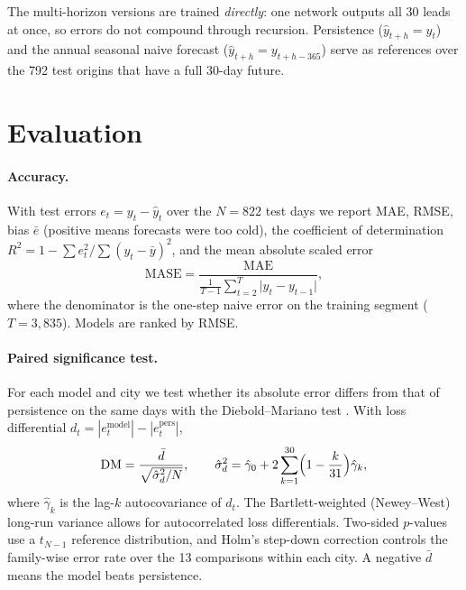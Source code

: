 \documentclass[11pt,a4paper]{article}
\begin{document}
The multi-horizon versions are trained \emph{directly}: one network outputs all 30 leads at once, so errors do not compound through recursion. Persistence ($\hat y_{t+h} = y_t$) and the annual seasonal naive forecast ($\hat y_{t+h} = y_{t+h-365}$) serve as references over the 792 test origins that have a full 30-day future.

\section{Evaluation}
\label{sec:eval}

\paragraph{Accuracy.} With test errors $e_t = y_t - \hat y_t$ over the $N = 822$ test days we report MAE, RMSE, bias $\bar e$ (positive means forecasts were too cold), the coefficient of determination $R^2 = 1 - \sum e_t^2 / \sum (y_t - \bar y)^2$, and the mean absolute scaled error \citep{hyndman2006another}
\begin{equation}
  \mathrm{MASE} = \frac{\mathrm{MAE}}{\frac{1}{T-1}\sum_{t=2}^{T}\lvert y_t - y_{t-1}\rvert},
\end{equation}
where the denominator is the one-step naive error on the training segment ($T = 3{,}835$). Models are ranked by RMSE.

\paragraph{Paired significance test.} For each model and city we test whether its absolute error differs from that of persistence on the same days with the Diebold--Mariano test \citep{diebold1995comparing}. With loss differential $d_t = |e^{\text{model}}_t| - |e^{\text{pers}}_t|$,
\begin{equation}
  \mathrm{DM} = \frac{\bar d}{\sqrt{\hat\sigma^2_{d}/N}}, \qquad
  \hat\sigma^2_{d} = \hat\gamma_0 + 2\sum_{k=1}^{30}\Bigl(1 - \frac{k}{31}\Bigr)\hat\gamma_k,
\end{equation}
where $\hat\gamma_k$ is the lag-$k$ autocovariance of $d_t$. The Bartlett-weighted (Newey--West) long-run variance \citep{newey1987simple} allows for autocorrelated loss differentials. Two-sided $p$-values use a $t_{N-1}$ reference distribution, and Holm's step-down correction \citep{holm1979simple} controls the family-wise error rate over the 13 comparisons within each city. A negative $\bar d$ means the model beats persistence.
\end{document}
